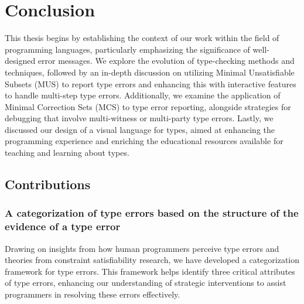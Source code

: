 

\chapter{Conclusion}

\label{chap:conclusion} 
\newcommand{\typetutor}{TypeTutor}

\graphicspath{{Figures/Conclusion}}

This thesis begins by establishing the context of our work within the field of programming languages, particularly emphasizing the significance of well-designed error messages. We explore the evolution of type-checking methods and techniques, followed by an in-depth discussion on utilizing Minimal Unsatisfiable Subsets (MUS) to report type errors and enhancing this with interactive features to handle multi-step type errors. Additionally, we examine the application of Minimal Correction Sets (MCS) to type error reporting, alongside strategies for debugging that involve multi-witness or multi-party type errors. Lastly, we discussed our design of a visual language for types, aimed at enhancing the programming experience and enriching the educational resources available for teaching and learning about types.

\section{Contributions}


\subsection{A categorization of type errors based on the structure of the evidence of a type error}


Drawing on insights from how human programmers perceive type errors and theories from constraint satisfiability research, we have developed a categorization framework for type errors. This framework helps identify three critical attributes of type errors, enhancing our understanding of strategic interventions to assist programmers in resolving these errors effectively.

